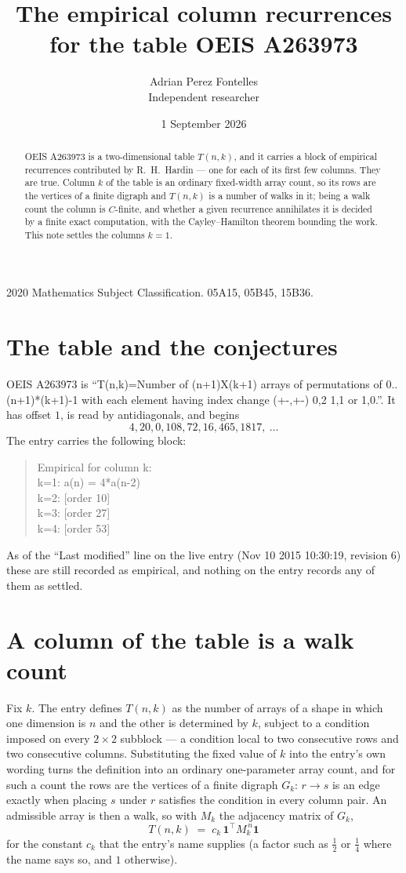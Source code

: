 \documentclass[11pt,a4paper]{article}
\title{The empirical column recurrences for the table OEIS A263973}
\author{Adrian Perez Fontelles\\ \small Independent researcher}
\date{1 September 2026}
\theoremstyle{plain}
\theoremstyle{definition}
\begin{document}
\maketitle

\begin{abstract}
OEIS A263973 is a two-dimensional table $T(n,k)$, and it carries a block of empirical
recurrences contributed by R.~H.~Hardin --- one for each of its first few columns. They are
true. Column $k$ of the table is an ordinary fixed-width array count, so its rows are the
vertices of a finite digraph and $T(n,k)$ is a number of walks in it; being a walk count the
column is $C$-finite, and whether a given recurrence annihilates it is decided by a finite
exact computation, with the Cayley--Hamilton theorem bounding the work. This note settles the columns $k=1$.
\end{abstract}

\noindent\small 2020 Mathematics Subject Classification. 05A15, 05B45, 15B36.\normalsize

\section{The table and the conjectures}

OEIS A263973 is ``T(n,k)=Number of (n+1)X(k+1) arrays of permutations of 0..(n+1)*(k+1)-1 with each element having index change (+-,+-) 0,2 1,1 or 1,0.''. It has offset $1$, is
read by antidiagonals, and begins
\[
4, 20, 0, 108, 72, 16, 465, 1817,\ \dots
\]
The entry carries the following block:
\begin{quote}\small
Empirical for column k:\\
k=1: a(n) = 4*a(n-2)\\
k=2: [order 10]\\
k=3: [order 27]\\
k=4: [order 53]\\
\end{quote}
As of the ``Last modified'' line on the live entry (Nov 10 2015 10:30:19, revision 6) these are still
recorded as empirical, and nothing on the entry records any of them as settled.

\section{A column of the table is a walk count}

Fix $k$. The entry defines $T(n,k)$ as the number of arrays of a shape in which one dimension
is $n$ and the other is determined by $k$, subject to a condition imposed on every
$2\times2$ subblock --- a condition local to two consecutive rows and two consecutive columns.
Substituting the fixed value of $k$ into the entry's own wording turns the definition into an
ordinary one-parameter array count, and for such a count the rows are the vertices of a finite
digraph $G_k$: $r\to s$ is an edge exactly when placing $s$ under $r$ satisfies the condition
in every column pair. An admissible array is then a walk, so with $M_k$ the adjacency matrix
of $G_k$,
\[
T(n,k)\;=\;c_k\,\mathbf{1}^{\!\top}M_k^{\,n}\mathbf{1}
\]
for the constant $c_k$ that the entry's name supplies (a factor such as $\tfrac12$ or
$\tfrac14$ where the name says so, and $1$ otherwise).
\end{document}
